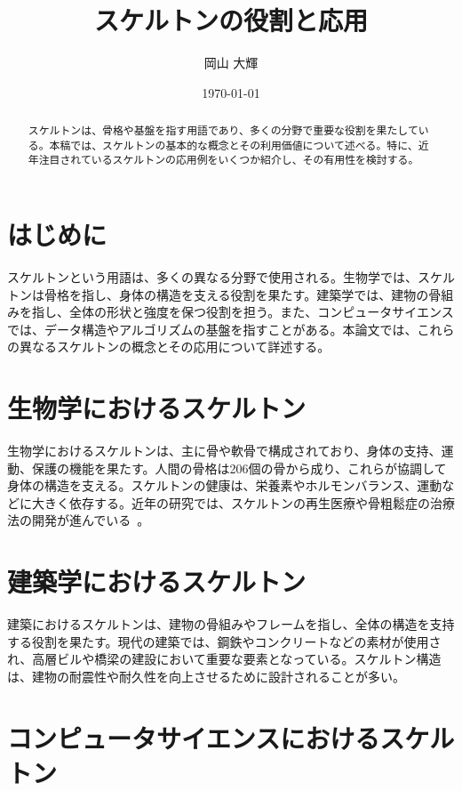 \documentclass[article]{jlreq}
\title{スケルトンの役割と応用}
\author{岡山 大輝}
\date{\today}
\begin{document}
\maketitle{}

\begin{abstract}
	スケルトンは、骨格や基盤を指す用語であり、多くの分野で重要な役割を果たしている。本稿では、スケルトンの基本的な概念とその利用価値について述べる。特に、近年注目されているスケルトンの応用例をいくつか紹介し、その有用性を検討する。
\end{abstract}

\section{はじめに}

スケルトンという用語は、多くの異なる分野で使用される。生物学では、スケルトンは骨格を指し、身体の構造を支える役割を果たす。建築学では、建物の骨組みを指し、全体の形状と強度を保つ役割を担う。また、コンピュータサイエンスでは、データ構造やアルゴリズムの基盤を指すことがある。本論文では、これらの異なるスケルトンの概念とその応用について詳述する。

\section{生物学におけるスケルトン}

生物学におけるスケルトンは、主に骨や軟骨で構成されており、身体の支持、運動、保護の機能を果たす。人間の骨格は206個の骨から成り、これらが協調して身体の構造を支える。スケルトンの健康は、栄養素やホルモンバランス、運動などに大きく依存する。近年の研究では、スケルトンの再生医療や骨粗鬆症の治療法の開発が進んでいる~\cite{okayama2024how}。

\section{建築学におけるスケルトン}

建築におけるスケルトンは、建物の骨組みやフレームを指し、全体の構造を支持する役割を果たす。現代の建築では、鋼鉄やコンクリートなどの素材が使用され、高層ビルや橋梁の建設において重要な要素となっている。スケルトン構造は、建物の耐震性や耐久性を向上させるために設計されることが多い。

\section{コンピュータサイエンスにおけるスケルトン}
\end{document}
